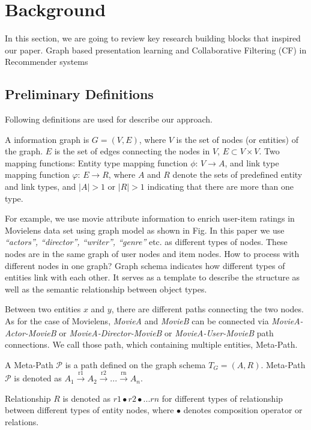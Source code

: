 \section{Background}
In this section, we are going to review key research building blocks that inspired our paper. Graph based presentation learning and Collaborative Filtering (CF) in Recommender systems


\subsection{Preliminary Definitions}\label{3PD}
Following definitions are used for describe our approach.

\begin{definition}
A information graph is $G = (V,E)$, where $V$ is the set of nodes (or entities) of the graph. $E$ is the set of edges connecting the nodes in $V$, $E \subset V \times V$. \newline
Two mapping functions: Entity type mapping function $\phi$: $V \rightarrow A$, and link type mapping function $\varphi$: $E \rightarrow R$, where $A$ and $R$ denote the sets of predefined entity and link types, and $|A| > 1$ or $|R| > 1$ indicating that there are more than one type.
\end{definition}

For example, we use movie attribute information to enrich user-item ratings in Movielens data set using graph model as shown in Fig. %
In this paper we use \textit{``actors'', ``director'', ``writer'', ``genre''} etc. as different types of nodes. These nodes are in the same graph of user nodes and item nodes. How to process with different nodes in one graph? Graph schema indicates how different types of entities link with each other. It serves as a template to describe the structure as well as the semantic relationship between object types.

Between two entities $x$ and $y$, there are different paths connecting the two nodes. As for the case of Movielens, \textit{MovieA} and \textit{MovieB} can be connected via \textit{MovieA-Actor-MovieB} or \textit{MovieA-Director-MovieB} or \textit{MovieA-User-MovieB} path connections. We call those path, which containing multiple entities, Meta-Path.

\begin{definition}\label{def:metaPath}
A Meta-Path $\mathcal{P}$ is a path defined on the  graph schema $T_G = (A, R)$. \newline
Meta-Path $\mathcal{P}$ is denoted as $A_1 \xrightarrow{\text{r1}} A_2 \xrightarrow{\text{r2}} ... \xrightarrow{\text{rn}} A_n$. 

Relationship $R$ is denoted as $r1 \bullet r2 \bullet ... rn$ for different types of relationship between different types of entity nodes, where $\bullet $ denotes composition operator or relations.
\end{definition}


